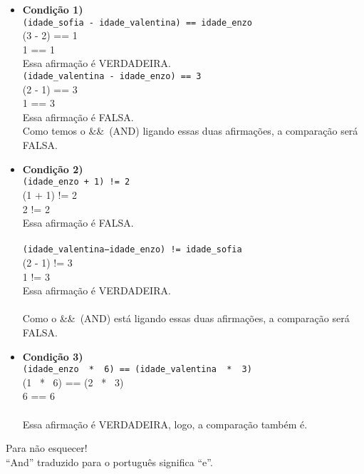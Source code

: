 \documentclass[conference]{IEEEtran}
\begin{document}
\begin{itemize}
    \item \textbf{Condição 1)} \\
    \texttt{(idade\_sofia - idade\_valentina) == idade\_enzo} \\
    (3 - 2) == 1 \\
    1 == 1 \\
    Essa afirmação é VERDADEIRA.\\

    \texttt{(idade\_valentina - idade\_enzo) == 3} \\
    (2 - 1) == 3 \\
    1 == 3 \\
    Essa afirmação é FALSA.\\

    Como temos o \&\&\ (AND) ligando essas duas afirmações, a comparação será FALSA.\\
    \item \textbf{Condição 2)}\\
    \texttt{(idade\_enzo + 1) != 2} \\
    (1 + 1) != 2 \\
    2 != 2 \\
    Essa afirmação é FALSA.\\
    \\
    \texttt{(idade\_valentina−idade\_enzo) != idade\_sofia}\\
    (2 - 1) != 3\\
    1 != 3\\
    Essa afirmação é VERDADEIRA.\\
    \\
    Como o \&\&\ (AND) está ligando essas duas afirmações, a comparação será FALSA.\\

    \item \textbf{Condição 3)}\\
    \texttt{(idade\_enzo \ * \ 6) == (idade\_valentina \ * \ 3)} \\
    (1 \ * \  6) == (2 \ * \ 3) \\
    6 == 6 \\
    \\
    Essa afirmação é VERDADEIRA, logo, a comparação também é.
\end{itemize}

\begin{center}
            {\color{azulbebe}Para não esquecer!}\\
            “And” traduzido para o português significa “e”.
\end{center}
\end{document}

